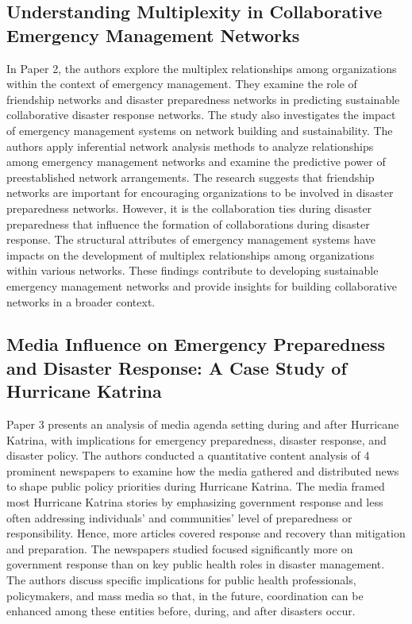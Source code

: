 \documentclass{article}
\begin{document}
\subsection{Understanding Multiplexity in Collaborative Emergency Management Networks}
In Paper 2, the authors explore the multiplex relationships among organizations within the context of emergency management. They examine the role of friendship networks and disaster preparedness networks in predicting sustainable collaborative disaster response networks. The study also investigates the impact of emergency management systems on network building and sustainability. The authors apply inferential network analysis methods to analyze relationships among emergency management networks and examine the predictive power of preestablished network arrangements. The research suggests that friendship networks are important for encouraging organizations to be involved in disaster preparedness networks. However, it is the collaboration ties during disaster preparedness that influence the formation of collaborations during disaster response. The structural attributes of emergency management systems have impacts on the development of multiplex relationships among organizations within various networks. These findings contribute to developing sustainable emergency management networks and provide insights for building collaborative networks in a broader context.

\subsection{Media Influence on Emergency Preparedness and Disaster Response: A Case Study of Hurricane Katrina}
Paper 3 presents an analysis of media agenda setting during and after Hurricane Katrina, with implications for emergency preparedness, disaster response, and disaster policy. The authors conducted a quantitative content analysis of 4 prominent newspapers to examine how the media gathered and distributed news to shape public policy priorities during Hurricane Katrina. The media framed most Hurricane Katrina stories by emphasizing government response and less often addressing individuals' and communities' level of preparedness or responsibility. Hence, more articles covered response and recovery than mitigation and preparation. The newspapers studied focused significantly more on government response than on key public health roles in disaster management. The authors discuss specific implications for public health professionals, policymakers, and mass media so that, in the future, coordination can be enhanced among these entities before, during, and after disasters occur.
\end{document}
